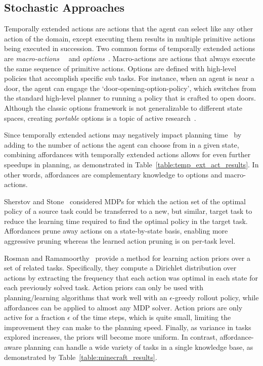\documentclass[letterpaper]{article}
\begin{document}
\subsection{Stochastic Approaches}

Temporally extended actions are actions that the agent can select like
any other action of the domain, except executing them results in
multiple primitive actions being executed in succession. Two common
forms of temporally extended actions are {\em
  macro-actions}~\cite{hauskrecht98} ~and {\em
  options}~\cite{sutton99}.  Macro-actions are actions that always
execute the same sequence of primitive actions. Options are defined
with high-level policies that accomplish specific sub tasks. For
instance, when an agent is near a door, the agent can engage the
`door-opening-option-policy', which switches from the standard
high-level planner to running a policy that is crafted to open doors.
Although the classic options framework is not generalizable to
different state spaces, creating {\em portable} options is a topic of
active
research~\cite{konidaris07,konidaris2009efficient,Ravindran03analgebraic,croonenborghs2008learning,andre2002state,konidaris2012transfer}.

Since temporally extended actions may negatively impact planning
time~\cite{Jong:2008zr} by adding to the number of actions the agent
can choose from in a given state, combining affordances with
temporally extended actions allows for even further speedups in
planning, as demonstrated in Table~\ref{table:temp_ext_act_results}. In
other words, affordances are complementary knowledge to options and
macro-actions.

Sherstov and Stone~\cite{sherstov2005improving} considered MDPs for
which the action set of the optimal policy of a source task could be
transferred to a new, but similar, target task to reduce the learning
time required to find the optimal policy in the target task.
Affordances prune away actions on a state-by-state basis, enabling
more aggressive pruning whereas the learned action pruning is on per-task
level.

Rosman and Ramamoorthy~\cite{rosman2012good} provide a method for
learning action priors over a set of related tasks. Specifically, they
compute a Dirichlet distribution over actions by extracting the
frequency that each action was optimal in each state for each
previously solved task.  Action priors can only be used with
planning/learning algorithms that work well with an $\epsilon$-greedy
rollout policy, while affordances can be applied to almost any MDP
solver.  Action priors are only active for a fraction $\epsilon$ of
the time steps, which is quite small, limiting the improvement they
can make to the planning speed.  Finally, as variance in tasks
explored increases, the priors will become more uniform. In contrast,
affordance-aware planning can handle a wide variety of tasks in a
single knowledge base, as demonstrated by
Table~\ref{table:minecraft_results}.
\end{document}
